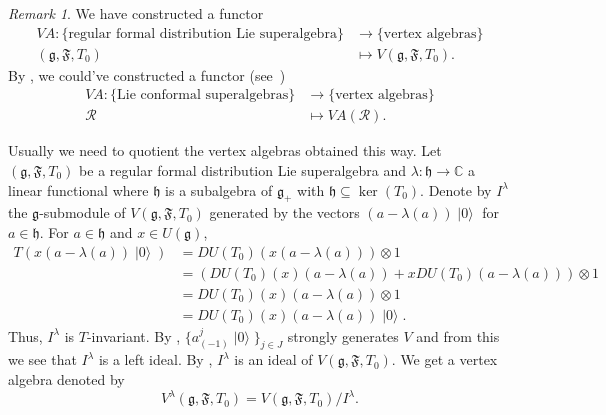 \documentclass[a4paper, 12pt, reqno]{amsart}
\theoremstyle{remark}
\newtheorem{remark}[theorem]{Remark}
\numberwithin{equation}{subsection}
\DeclareMathOperator{\vac}{|0\rangle}
\begin{document}
\begin{remark}
  \label{rmk:13}
  We have constructed a functor
  \begin{align*}
    VA: \{\text{regular formal distribution Lie superalgebra}\} &\to \{\text{vertex algebras}\} \\
    (\mathfrak{g}, \mathfrak{F}, T_0) &\mapsto V(\mathfrak{g}, \mathfrak{F}, T_0).
  \end{align*}
  By , we could've constructed a functor (see~\cite[Theorem 2.15]{li_vertex_2004})
  \begin{align*}
    VA: \{\text{Lie conformal superalgebras}\} &\to \{\text{vertex algebras}\} \\
    \mathcal{R} &\mapsto VA(\mathcal{R}).
  \end{align*}
\end{remark}

Usually we need to quotient the vertex algebras obtained this way.
Let $(\mathfrak{g}, \mathfrak{F}, T_0)$ be a regular formal distribution Lie superalgebra and $\lambda: \mathfrak{h} \to \mathbb{C}$ a linear functional where $\mathfrak{h}$ is a subalgebra of $\mathfrak{g}_+$ with $\mathfrak{h} \subseteq \ker(T_0)$.
Denote by $I^{\lambda}$ the $\mathfrak{g}$-submodule of $V(\mathfrak{g}, \mathfrak{F}, T_0)$ generated by the vectors $(a - \lambda(a))\vac$ for $a \in \mathfrak{h}$.
For $a \in \mathfrak{h}$ and $x \in U(\mathfrak{g})$,
\begin{align*}
  T(x(a - \lambda(a))\vac) &= DU(T_0)(x(a - \lambda(a)))\otimes1 \\
  &= (DU(T_0)(x)(a - \lambda(a)) + xDU(T_0)(a - \lambda(a)))\otimes1 \\
  &= DU(T_0)(x)(a - \lambda(a))\otimes1 \\
  &= DU(T_0)(x)(a - \lambda(a))\vac.
\end{align*}
Thus, $I^{\lambda}$ is $T$-invariant.
By , $\{a^j_{(-1)}\vac \}_{j \in J}$ strongly generates $V$ and from this we see that $I^{\lambda}$ is a left ideal.
By , $I^{\lambda}$ is an ideal of $V(\mathfrak{g}, \mathfrak{F}, T_0)$.
We get a vertex algebra denoted by
\begin{equation*}
  V^{\lambda}(\mathfrak{g}, \mathfrak{F}, T_0) = V(\mathfrak{g}, \mathfrak{F}, T_0)/I^{\lambda}.
\end{equation*}
\end{document}
